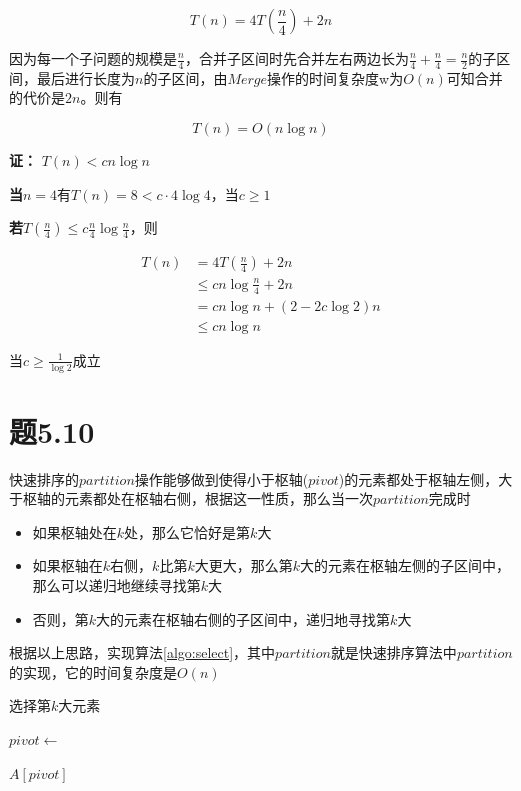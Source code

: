 \documentclass[a4paper,twoside]{article}
\begin{document}
\begin{spacing}{1.2}
$$
T(n)=4T(\frac{n}{4})+2n
$$

因为每一个子问题的规模是$\frac{n}{4}$，合并子区间时先合并左右两边长为$\frac{n}{4}+\frac{n}{4}=\frac{n}{2}$的子区间，最后进行长度为$n$的子区间，由$Merge$操作的时间复杂度w为$O(n)$可知合并的代价是$2n$。则有

$$
T(n)=O(n\log n)
$$

\textbf{证：} $T(n)<cn\log n$

\textbf{当$n=4$}有$T(n)=8<c\cdot4\log 4$，当$c\ge 1$

\textbf{若}$T(\frac{n}{4})\le c\frac{n}{4}\log \frac{n}{4}$，则

\begin{align*}
	T(n)&=4T(\frac{n}{4})+2n \\
	&\le cn\log \frac{n}{4}+2n \\
	&=cn\log n+(2-2c\log 2)n \\
	&\le cn\log n
\end{align*}

当$c\ge \frac{1}{\log 2}$成立

\section{题5.10}

快速排序的$partition$操作能够做到使得小于枢轴($pivot$)的元素都处于枢轴左侧，大于枢轴的元素都处在枢轴右侧，根据这一性质，那么当一次$partition$完成时

\begin{itemize}
	\item 如果枢轴处在$k$处，那么它恰好是第$k$大
	\item 如果枢轴在$k$右侧，$k$比第$k$大更大，那么第$k$大的元素在枢轴左侧的子区间中，那么可以递归地继续寻找第$k$大
	\item 否则，第$k$大的元素在枢轴右侧的子区间中，递归地寻找第$k$大
\end{itemize}

根据以上思路，实现算法\ref{algo:select}，其中$partition$就是快速排序算法中$partition$的实现，它的时间复杂度是$O(n)$

\begin{algorithm}
\caption{选择第$k$大元素}
\label{algo:select}
\begin{algorithmic}[1]
	
	\State $pivot \gets $ 
	
	\State \Return $A[pivot]$
	\State \Return {}
	\Else
	\State \Return {}
	\EndIf
	

\end{algorithmic}
\end{algorithm}
\end{spacing}
\end{document}
